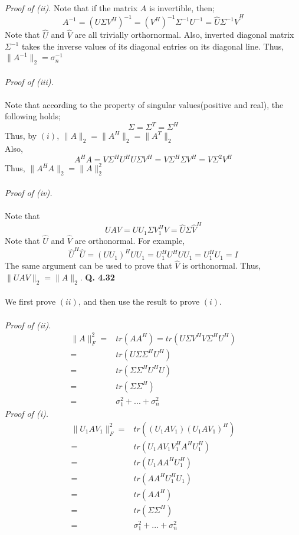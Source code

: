 \documentclass[letterpaper,12pt]{article}
\theoremstyle{definition}
\begin{document}
\emph{Proof of (ii). } Note that if the matrix $A$ is invertible, then;
\[A^{-1} = (U \Sigma V^H)^{-1} = (V^H)^{-1} \Sigma^{-1} U^{-1} = \hat{U} \Sigma^{-1} \hat{V}^H \]
Note that $\hat{U}$ and $\hat{V}$ are all trivially orthornormal. Also, inverted diagonal matrix $\Sigma^{-1}$ takes the inverse values of its diagonal entries on its diagonal line. Thus, $\|A^{-1}\|_2 = \sigma_{n}^{-1} $ \\\\
\emph{Proof of (iii). } \\\\
Note that according to the property of singular values(positive and real), the following holds;
\[\Sigma = \Sigma^T = \Sigma^H \]
Thus, by $(i)$, $\|A\|_2 = \|A^H\|_2 = \|A^T\|_2$ \\
Also,
\[A^H A = V \Sigma^H U^H U \Sigma V^H = V \Sigma^H \Sigma V^H = V \Sigma^2 V^H\]
Thus, $\|A^H A\|_2 = \|A\|_{2}^{2}$ \\\\
\emph{Proof of (iv).} \\\\
Note that
\[UAV = U U_1 \Sigma V_{1}^H V = \hat{U} \Sigma \hat{V}^H\]
Note that $\hat{U}$ and $\hat{V}$ are orthonormal. For example,
\[\hat{U}^H \hat{U} = (U U_1)^H U U_1 = U_{1}^H U^H U U_1 = U_{1}^H U_1 = I\]
The same argument can be used to prove that $\hat{V}$ is orthonormal. Thus, $\|UAV\|_2 = \|A\|_2$.
\textbf{Q. 4.32}\\\\
We first prove $(ii)$, and then use the result to prove $(i)$. \\\\
\emph{Proof of (ii).}
\begin{align*}
   \|A\|_{F}^{2} =& tr(A A^H) = tr(U \Sigma V^H V \Sigma^H U^H) \\
                 =& tr(U \Sigma \Sigma^H U^H) \\
                 =& tr(\Sigma \Sigma^H U^H U) \\
                 =& tr(\Sigma \Sigma^H) \\
                 =& \sigma_{1}^2 + ... + \sigma_{n}^2
\end{align*}
\emph{Proof of (i).}
\begin{align*}
   \|U_1 A V_1\|_{F}^{2} =& tr((U_1 A V_1) (U_1 A V_1)^H) \\
                         =& tr(U_1 A V_1 V_{1}^H A^H U_{1}^H) \\
                         =& tr(U_1 A A^H U_{1}^H) \\
                         =& tr(A A^H U_{1}^H U_{1}) \\
                         =& tr(AA^H) \\
                         =& tr(\Sigma \Sigma^H) \\
                         =& \sigma_{1}^2 + ... + \sigma_{n}^2
\end{align*}
\end{document}
